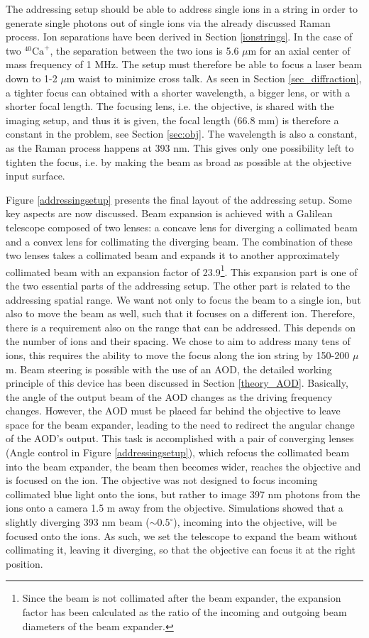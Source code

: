 The addressing setup should be able to address single ions in a string in order to generate single photons out of single ions via the already discussed Raman process. Ion separations have been derived in Section \ref{ionstrings}. In the case of two $^{40}\text{Ca}^+$, the separation between the two ions is 5.6 $\mu$m for an axial center of mass frequency of 1 MHz. The setup must therefore be able to focus a laser beam down to 1-2 $\mu$m waist to minimize cross talk. As seen in Section \ref{sec_diffraction}, a tighter focus can obtained with a shorter wavelength, a bigger lens, or with a shorter focal length. The focusing lens, i.e. the objective, is shared with the imaging setup, and thus it is given, the focal length (66.8 mm) is therefore a constant in the problem, see Section \ref{sec:obj}. The wavelength is also a constant, as the Raman process happens at 393 nm. This gives only one possibility left to tighten the focus, i.e. by making the beam as broad as possible at the objective input surface.\par
Figure \ref{addressingsetup} presents the final layout of the addressing setup. Some key aspects are now discussed. Beam expansion is achieved with a Galilean telescope composed of two lenses: a concave lens for diverging a collimated beam and a convex lens for collimating the diverging beam. The combination of these two lenses takes a collimated beam and expands it to another approximately collimated beam with an expansion factor of 23.9\footnote{Since the beam is not collimated after the beam expander, the expansion factor has been calculated as the ratio of the incoming and outgoing beam diameters of the beam expander.}. This expansion part is one of the two essential parts of the addressing setup. The other part is related to the addressing spatial range. We want not only to focus the beam to a single ion, but also to move the beam as well, such that it focuses on a different ion. Therefore, there is a requirement also on the range that can be addressed. This depends on the number of ions and their spacing. We chose to aim to address many tens of ions, this requires the ability to move the focus along the ion string by 150-200 $\mu$m. Beam steering is possible with the use of an AOD, the detailed working principle of this device has been discussed in Section \ref{theory_AOD}. Basically, the angle of the output beam of the AOD changes as the driving frequency changes. However, the AOD must be placed far behind the objective to leave space for the beam expander, leading to the need to redirect the angular change of the AOD's output. This task is accomplished with a pair of converging lenses (Angle control in Figure \ref{addressingsetup}), which refocus the collimated beam into the beam expander, the beam then becomes wider, reaches the objective and is focused on the ion. The objective was not designed to focus incoming collimated blue light onto the ions, but rather to image 397 nm photons from the ions onto a camera 1.5 m away from the objective. Simulations showed that a slightly diverging 393 nm beam ($\sim 0.5^\circ$), incoming into the objective, will be focused onto the ions. As such, we set the telescope to expand the beam without collimating it, leaving it diverging, so that the objective can focus it at the right position.\par
